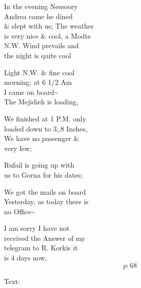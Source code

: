 \documentclass{report}
\begin{document}

	\par{
 	In the evening Nessoory\ \\Andrea came he dined\ \\\& slept with us; The weather\ \\is very nice \& cool, a Modte\ \\N.W. Wind prevails and\ \\the night is quite cool\ \\
	}

	\par{
 	Light N.W. \& fine cool\ \\morning; at 6 1/2 Am\ \\I came on board\~{}\ \\The Mejidieh is loading,\ \\
	}

	\par{
 	We finished at 1 P.M. only\ \\loaded down to 3,,8 Inches,\ \\We have no passenger \&\ \\very few;\ \\
	}

	\par{
 	Rufail is going up with\ \\us to Gorna for his dates;\ \\
	}

	\par{
 	We got the mails on board\ \\Yesterday, as today there is\ \\no Office\~{}\ \\
	}

	\par{
 	I am sorry I have not\ \\received the Answer of my\ \\telegram to R. Korkis it\ \\is 4 days now,\ \\
  \[p: 68 \]

	}





	\par{
 	Text:\ \\
	}
\end{document}
